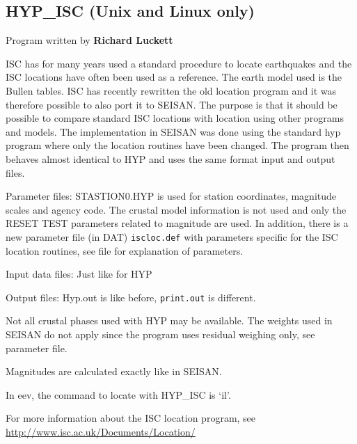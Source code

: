 
\subsection{HYP\_ISC (Unix and Linux only)}
\label{subs:hyp-isc} 

Program written by \textbf{Richard Luckett}

ISC has for many years used a standard procedure to locate earthquakes and the ISC locations have often been used as a reference. The earth model used is the Bullen tables. ISC has recently rewritten the old location program and it was therefore possible to also port it to SEISAN. The purpose is that it should be possible to compare standard ISC locations with location using other programs and models. The implementation in SEISAN was done using the standard hyp program where only the location routines have been changed. The program then behaves almost identical to HYP and uses the same format input and output files. 

Parameter files: STASTION0.HYP is used for station coordinates,  magnitude scales and agency code. The crustal model information is not used and only the RESET TEST parameters related to magnitude are used. In addition, there is a new parameter file (in DAT) \texttt{iscloc.def} with parameters specific for the ISC location routines, see file for explanation of parameters.   

Input data files: Just like for HYP 

Output files: Hyp.out is like before, \texttt{print.out} is different. 

Not all crustal phases used with HYP may be available. The  weights used in SEISAN do not apply since the program uses residual weighing only, see parameter file. 

Magnitudes are calculated exactly like in SEISAN. 

In eev, the command to locate with HYP\_ISC is `il'. 

For more information about the ISC location program, see \url{http://www.isc.ac.uk/Documents/Location/}


